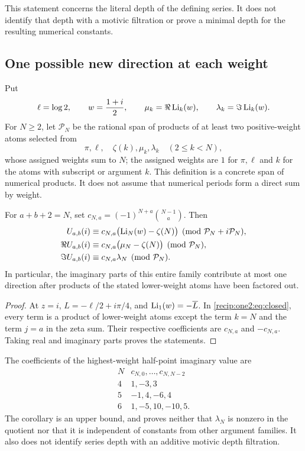 This statement concerns the literal depth of the defining series.
It does not identify that depth with a motivic filtration or prove a
minimal depth for the resulting numerical constants.

\subsection{One possible new direction at each weight}

Put
\[
 \ell=\log2,\qquad w=\frac{1+i}{2},\qquad
 \mu_k=\Re\operatorname{Li}_k(w),\qquad\lambda_k=\Im\operatorname{Li}_k(w).
\]
For $N\ge2$, let $\mathcal P_N$ be the rational span of products of
at least two positive-weight atoms selected from
\[
 \pi,\ell,\quad \zeta(k),\mu_k,\lambda_k\quad(2\le k<N),
\]
whose assigned weights sum to $N$; the assigned weights are $1$ for
$\pi,\ell$ and $k$ for the atoms with subscript or argument $k$.
This definition is a concrete span of numerical products.  It does
not assume that numerical periods form a direct sum by weight.

\begin{corollary}
\label{recip:one2:cor:primitive}
For $a+b+2=N$, set
$c_{N,a}=(-1)^{N+a}\binom{N-1}{a}$.  Then
\begin{align}
 U_{a,b}(i)&\equiv c_{N,a}\bigl(\operatorname{Li}_N(w)-\zeta(N)\bigr)
        \pmod{\mathcal P_N+i\mathcal P_N},\label{recip:one2:eq:complexprimitive}\\
 \Re U_{a,b}(i)&\equiv c_{N,a}\bigl(\mu_N-\zeta(N)\bigr)
        \pmod{\mathcal P_N},\label{recip:one2:eq:realprimitive}\\
 \Im U_{a,b}(i)&\equiv c_{N,a}\lambda_N
        \pmod{\mathcal P_N}.\label{recip:one2:eq:imagprimitive}
\end{align}
In particular, the imaginary parts of this entire family contribute
at most one direction after products of the stated lower-weight
atoms have been factored out.
\end{corollary}
\begin{proof}
At $z=i$, $L=-\ell/2+i\pi/4$, and
$\operatorname{Li}_1(w)=-\overline L$.  In \eqref{recip:one2:eq:closed}, every term is a
product of lower-weight atoms except the term $k=N$ and the term
$j=a$ in the zeta sum.  Their respective coefficients are
$c_{N,a}$ and $-c_{N,a}$.  Taking real and imaginary parts proves the
statements.
\end{proof}

The coefficients of the highest-weight half-point imaginary value are
\[
 \begin{array}{c|l}
 N&c_{N,0},\ldots,c_{N,N-2}\\\hline
 4&1,-3,3\\
 5&-1,4,-6,4\\
 6&1,-5,10,-10,5.
 \end{array}
\]
The corollary is an upper bound, and proves neither that $\lambda_N$
is nonzero in the quotient nor that it is independent of constants
from other argument families.  It also does not identify series
depth with an additive motivic depth filtration.

